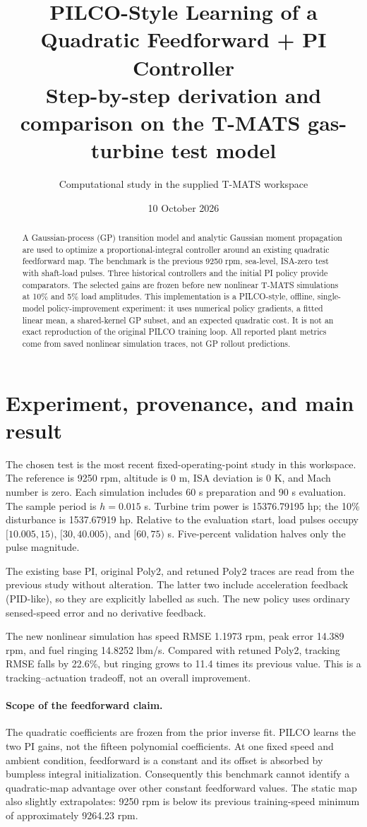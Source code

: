 \documentclass[11pt,a4paper]{article}
\title{PILCO-Style Learning of a Quadratic Feedforward + PI Controller\\\large Step-by-step derivation and comparison on the T-MATS gas-turbine test model}
\author{Computational study in the supplied T-MATS workspace}
\date{10 October 2026}
\begin{document}
\maketitle
\begin{abstract}
A Gaussian-process (GP) transition model and analytic Gaussian moment propagation are used to optimize a proportional-integral controller around an existing quadratic feedforward map. The benchmark is the previous 9250 rpm, sea-level, ISA-zero test with shaft-load pulses. Three historical controllers and the initial PI policy provide comparators. The selected gains are frozen before new nonlinear T-MATS simulations at 10\% and 5\% load amplitudes. This implementation is a PILCO-style, offline, single-model policy-improvement experiment: it uses numerical policy gradients, a fitted linear mean, a shared-kernel GP subset, and an expected quadratic cost. It is not an exact reproduction of the original PILCO training loop. All reported plant metrics come from saved nonlinear simulation traces, not GP rollout predictions.
\end{abstract}
\section{Experiment, provenance, and main result}
The chosen test is the most recent fixed-operating-point study in this workspace. The reference is 9250 rpm, altitude is 0 m, ISA deviation is 0 K, and Mach number is zero. Each simulation includes 60 s preparation and 90 s evaluation. The sample period is $h=0.015$ s. Turbine trim power is 15376.79195 hp; the 10\% disturbance is 1537.67919 hp. Relative to the evaluation start, load pulses occupy $[10.005,15)$, $[30,40.005)$, and $[60,75)$ s. Five-percent validation halves only the pulse magnitude.

The existing base PI, original Poly2, and retuned Poly2 traces are read from the previous study without alteration. The latter two include acceleration feedback (PID-like), so they are explicitly labelled as such. The new policy uses ordinary sensed-speed error and no derivative feedback.

The new nonlinear simulation has speed RMSE 1.1973 rpm, peak error 14.389 rpm, and fuel ringing 14.8252 lbm/s. Compared with retuned Poly2, tracking RMSE falls by 22.6\%, but ringing grows to 11.4 times its previous value. This is a tracking--actuation tradeoff, not an overall improvement.

\paragraph{Scope of the feedforward claim.} The quadratic coefficients are frozen from the prior inverse fit. PILCO learns the two PI gains, not the fifteen polynomial coefficients. At one fixed speed and ambient condition, feedforward is a constant and its offset is absorbed by bumpless integral initialization. Consequently this benchmark cannot identify a quadratic-map advantage over other constant feedforward values. The static map also slightly extrapolates: 9250 rpm is below its previous training-speed minimum of approximately 9264.23 rpm.
\end{document}
